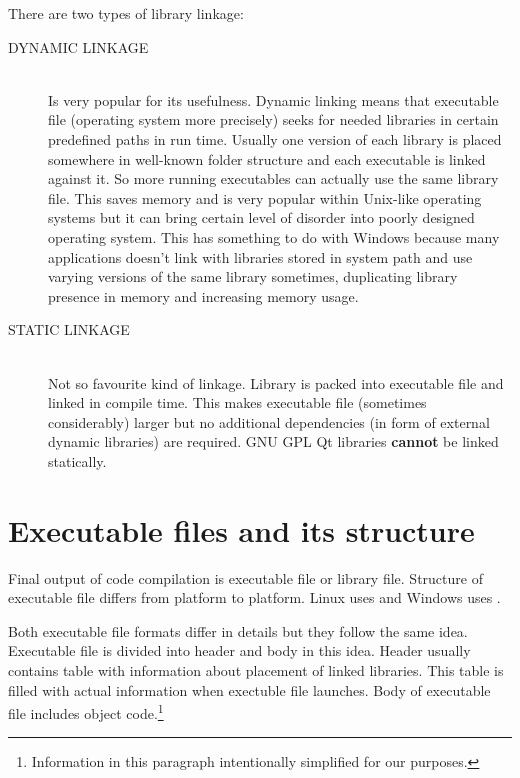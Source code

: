 \begin{fdocextra}
There are two types of library linkage:
\begin{description}
\item[DYNAMIC LINKAGE] \hfill \\
Is very popular for its usefulness. Dynamic linking means that executable file (operating system more precisely) seeks for needed libraries in certain predefined paths in run time. Usually one version of each library is placed somewhere in well-known folder structure and each executable is linked against it. So more running executables can actually use the same library file. This saves memory and is very popular within Unix-like operating systems but it can bring certain level of disorder into poorly designed operating system. This has something to do with Windows because many applications doesn't link with libraries stored in system path and use varying versions of the same library sometimes, duplicating library presence in memory and increasing memory usage.
\item[STATIC LINKAGE] \hfill \\
Not so favourite kind of linkage. Library is packed into executable file and linked in compile time. This makes executable file (sometimes considerably) larger but no additional dependencies (in form of external dynamic libraries) are required. GNU GPL Qt libraries \textbf{cannot} be linked statically.
\end{description}
\end{fdocextra}

\section{Executable files and its structure}
Final output of \cpp{} code compilation is executable file or library file. Structure of executable file differs from platform to platform. Linux uses  and Windows uses .

Both executable file formats differ in details but they follow the same idea. Executable file is divided into header and body in this idea. Header usually contains table with information about placement of linked libraries. This table is filled with actual information when exectuble file launches. Body of executable file includes object code.\footnote{Information in this paragraph intentionally simplified for our purposes.}

